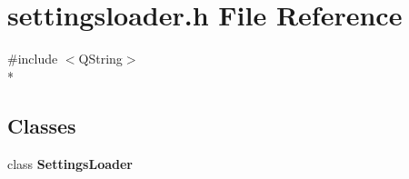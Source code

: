 \section{settingsloader.\+h File Reference}
\label{bk3_2properties_2settingsloader_8h}
{\ttfamily \#include $<$Q\+String$>$}\\*
\subsection*{Classes}
\begin{DoxyCompactItemize}
\item 
class {\bf Settings\+Loader}
\end{DoxyCompactItemize}

